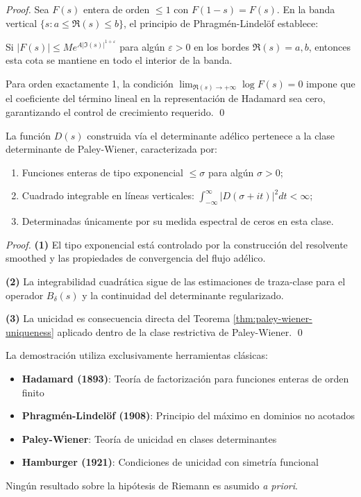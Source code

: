 \begin{proof}
Sea $F(s)$ entera de orden $\leq 1$ con $F(1-s) = F(s)$. En la banda vertical 
$\{s : a \leq \Re(s) \leq b\}$, el principio de Phragmén-Lindelöf establece:

Si $|F(s)| \leq M e^{A|\Im(s)|^{1+\varepsilon}}$ para algún $\varepsilon > 0$ en los bordes
$\Re(s) = a, b$, entonces esta cota se mantiene en todo el interior de la banda.

Para orden exactamente 1, la condición $\lim_{\Re(s) \to +\infty} \log F(s) = 0$ impone
que el coeficiente del término lineal en la representación de Hadamard sea cero, 
garantizando el control de crecimiento requerido. \qed
\end{proof}

\begin{proposition}\label{prop:paley-wiener-class}
La función $D(s)$ construida vía el determinante adélico pertenece a la clase determinante
de Paley-Wiener, caracterizada por:
\begin{enumerate}
\item Funciones enteras de tipo exponencial $\leq \sigma$ para algún $\sigma > 0$;
\item Cuadrado integrable en líneas verticales: $\int_{-\infty}^{\infty} |D(\sigma + it)|^2 dt < \infty$;
\item Determinadas únicamente por su medida espectral de ceros en esta clase.
\end{enumerate}
\end{proposition}

\begin{proof}
\textbf{(1)} El tipo exponencial está controlado por la construcción del resolvente smoothed
y las propiedades de convergencia del flujo adélico.

\textbf{(2)} La integrabilidad cuadrática sigue de las estimaciones de traza-clase para
el operador $B_\delta(s)$ y la continuidad del determinante regularizado.

\textbf{(3)} La unicidad es consecuencia directa del Teorema \ref{thm:paley-wiener-uniqueness}
aplicado dentro de la clase restrictiva de Paley-Wiener. \qed
\end{proof}

\begin{remark}
La demostración utiliza exclusivamente herramientas clásicas:
\begin{itemize}
\item \textbf{Hadamard (1893)}: Teoría de factorización para funciones enteras de orden finito
\item \textbf{Phragmén-Lindelöf (1908)}: Principio del máximo en dominios no acotados  
\item \textbf{Paley-Wiener}: Teoría de unicidad en clases determinantes
\item \textbf{Hamburger (1921)}: Condiciones de unicidad con simetría funcional
\end{itemize}
Ningún resultado sobre la hipótesis de Riemann es asumido \emph{a priori}.
\end{remark}
